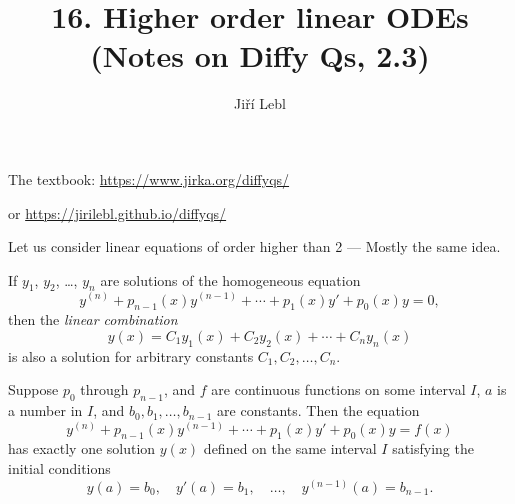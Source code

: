 \documentclass[10pt,aspectratio=169]{beamer}
\author{Ji\v{r}\'i Lebl}
\institute[OSU]{%
Oklahoma State University%
}
\title{16. Higher order linear ODEs\\(Notes on Diffy Qs, 2.3)}
\date{}
\begin{document}
\begin{frame}
\titlepage


\begin{center}
The textbook: \url{https://www.jirka.org/diffyqs/}

or \url{https://jirilebl.github.io/diffyqs/}
\end{center}
\end{frame}

\begin{frame}
Let us consider linear equations of order higher than 2 --- Mostly the same
idea.

\pause

\begin{theorem}[Superposition]
If $y_1$, $y_2$, \ldots, $y_n$ are solutions of the
homogeneous equation
\[
y^{(n)} + p_{n-1}(x)y^{(n-1)} + \cdots + p_1(x) y' + p_0(x) y = 0 ,
\]
then the \emph{linear combination}
\[
y(x) = C_1 y_1(x) + C_2 y_2(x) + \cdots + C_n y_n(x) 
\]
is also a solution
for arbitrary constants $C_1, C_2, \ldots, C_n$.
\end{theorem}

\end{frame}

\begin{frame}

\begin{theorem}
Suppose $p_0$ through $p_{n-1}$, and $f$ are continuous functions
on some interval $I$,
$a$ is a number in $I$,
and $b_0, b_1, \ldots, b_{n-1}$ are constants.
Then the equation
\[
y^{(n)} + p_{n-1}(x)y^{(n-1)} + \cdots + p_1(x) y' + p_0(x) y = f(x) 
\]
has exactly one solution $y(x)$ defined on the same interval $I$
satisfying the initial conditions
\begin{equation*}
y(a) = b_0, \quad y'(a) = b_1, \quad \ldots, \quad y^{(n-1)}(a) = b_{n-1} .
\end{equation*}
\end{theorem}
\end{frame}
\end{document}
